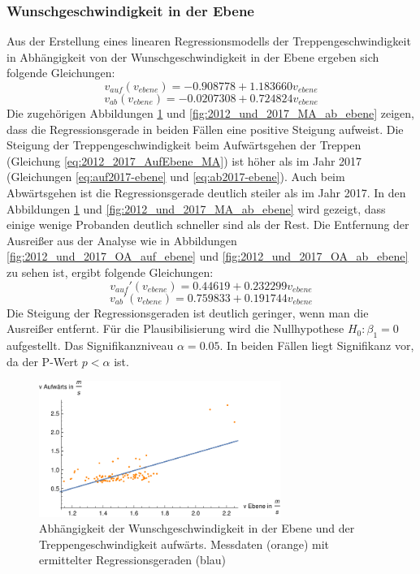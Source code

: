 \subsubsection{Wunschgeschwindigkeit in der Ebene}
Aus der Erstellung eines linearen Regressionsmodells der Treppengeschwindigkeit in Abhängigkeit von der Wunschgeschwindigkeit in der Ebene ergeben sich folgende Gleichungen:
\begin{equation}
v_{auf}(v_{ebene}) = -0.908778 + 1.183660 v_{ebene}
\label{eq:2012_2017_AufEbene_MA}
\end{equation}
\begin{equation}
v_{ab}(v_{ebene}) = -0.0207308+0.724824 v_{ebene}
\label{eq:2012_2017_AbEbene_MA}
\end{equation}
Die zugehörigen Abbildungen \ref{fig:2012_und_2017_MA_auf_ebene} und \ref{fig:2012_und_2017_MA_ab_ebene} zeigen, dass die Regressionsgerade in beiden Fällen eine positive Steigung aufweist. Die Steigung der Treppengeschwindigkeit beim Aufwärtsgehen der Treppen (Gleichung \ref{eq:2012_2017_AufEbene_MA}) ist höher als im Jahr 2017 (Gleichungen \ref{eq:auf2017-ebene} und \ref{eq:ab2017-ebene}). Auch beim Abwärtsgehen ist die Regressionsgerade deutlich steiler als im Jahr 2017. In den Abbildungen \ref{fig:2012_und_2017_MA_auf_ebene} und \ref{fig:2012_und_2017_MA_ab_ebene} wird gezeigt, dass einige wenige Probanden deutlich schneller sind als der Rest. Die Entfernung der Ausreißer aus der Analyse wie in Abbildungen \ref{fig:2012_und_2017_OA_auf_ebene} und \ref{fig:2012_und_2017_OA_ab_ebene} zu sehen ist, ergibt folgende Gleichungen: 
\begin{equation}
v_{auf}'(v_{ebene}) = 0.44619 +0.232299 v_{ebene}
\label{eq:2012_2017_AufEbene_OA}
\end{equation}
\begin{equation}
v_{ab}'(v_{ebene}) = 0.759833 +0.191744 v_{ebene}
\label{eq:2012_2017_AbEbene_OA}
\end{equation}
Die Steigung der Regressionsgeraden ist deutlich geringer, wenn man die Ausreißer entfernt. 
Für die Plausibilisierung wird die Nullhypothese $H_0: \beta_1 = 0$ aufgestellt. Das Signifikanzniveau $\alpha= 0.05$. In beiden Fällen liegt Signifikanz vor, da der P-Wert $p<\alpha$ ist.

\begin{figure}[htpb]
	\centering
	\includegraphics[width=0.7\textwidth]{abbildungen/regression/2012_2017_verbund/auf-ebene.pdf}
	
	\caption{Abhängigkeit der Wunschgeschwindigkeit in der Ebene und der Treppengeschwindigkeit aufwärts. Messdaten (orange) mit ermittelter Regressionsgeraden (blau)}
	\label{fig:2012_und_2017_MA_auf_ebene}
\end{figure}

